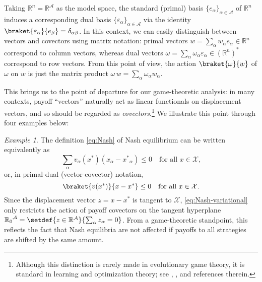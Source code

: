 \documentclass[reqno]{amsart}
\theoremstyle{plain}
\theoremstyle{definition}
\theoremstyle{remark}
\newtheorem{example}[theorem]{Example}
\numberwithin{equation}{section}
\numberwithin{theorem}{section}
\begin{document}
Taking ${{\mathbb{R}}^{n}} = {\mathbb{R}}^{\mathcal{A}}$ as the model space, the standard (primal) basis $\{{e}_{\alpha}\}_{\alpha\in{\mathcal{A}}}$ of ${{\mathbb{R}}^{n}}$ induces a corresponding dual basis $\{{\varepsilon}_{\alpha}\}_{\alpha\in{\mathcal{A}}}$ via the identity $\braket{{\varepsilon}_{\alpha}}{{e}_{\beta}} = \delta_{\alpha\beta}$.
In this context, we can easily distinguish between vectors and covectors using matrix notation:
primal vectors $w = {\sum\nolimits}_{\alpha} w_{\alpha} {e}_{\alpha} \in {{\mathbb{R}}^{n}}$ correspond to column vectors, whereas dual vectors $\omega = {\sum\nolimits}_{\alpha} \omega_{\alpha} {\varepsilon}_{\alpha} \in {({\mathbb{R}}^{n})^{\ast}}$ correspond to row vectors.
From this point of view, the action $\braket{\omega}{w}$ of $\omega$ on $w$ is just the matrix product $\omega\,w = {\sum\nolimits}_{\alpha} \omega_{\alpha} w_{\alpha}$.

This brings us to the point of departure for our game-theoretic analysis:
in many contexts, payoff ``vectors'' naturally act as linear functionals on displacement vectors, and so should be regarded as \emph{covectors}.\footnote{Although this distinction is rarely made in evolutionary game theory, it is standard in learning and optimization theory; see \cite{NY83}, \cite{SS11}, and references therein.}
We illustrate this point through four examples below:

\begin{example}
\label{ex:Nash}
The definition \eqref{eq:Nash} of Nash equilibrium can be written equivalently as
\begin{equation}
{\sum\nolimits}_{\alpha} {v}_{\alpha}({x^{\ast}}) (x_{\alpha} - {x^{\ast}}_{\alpha})
	\leq 0
	\quad
	\text{for all $x\in{\mathcal{X}}$,}
\end{equation}
or, in primal-dual (vector-covector) notation,
\begin{equation}
\label{eq:Nash-variational}
\braket{{v}({x^{\ast}})}{x - {x^{\ast}}}
	\leq 0
	\quad
	\text{for all $x\in{\mathcal{X}}$.}
\end{equation}
Since the displacement vector $z = x - {x^{\ast}}$ is tangent to ${\mathcal{X}}$, \eqref{eq:Nash-variational} only restricts the action of 
payoff covectors on the tangent hyperplane ${{\mathbb{R}}_{0}}^{\mathcal{A}} = \setdef{z\in{\mathbb{R}}^{\mathcal{A}}}{\sum_{\alpha} z_{\alpha} = 0}$.
From a game-theoretic standpoint, this reflects the fact that Nash equilibria are not affected if payoffs to all strategies are shifted by the same amount.
\end{example}
\end{document}
